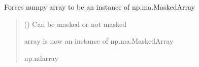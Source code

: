 \documentclass[letterpaper,10pt,english]{sphinxmanual}
\begin{document}
\begin{fulllineitems}
\label{\detokenize{misc:glomar_gridding.utils.mask_array}}
\pysigstartsignatures
\pysiglinewithargsret
{}
{}
{}
\pysigstopsignatures
\sphinxAtStartPar
Forces numpy array to be an instance of np.ma.MaskedArray
\begin{quote}\begin{description}
\sphinxAtStartPar
{} () \textendash{} Can be masked or not masked

\sphinxAtStartPar
{} \textendash{} array is now an instance of np.ma.MaskedArray

\sphinxAtStartPar
np.ndarray

\end{description}\end{quote}

\end{fulllineitems}

\end{document}
